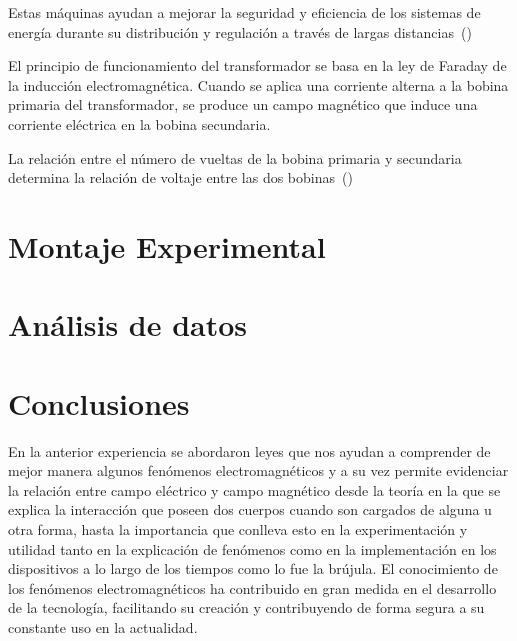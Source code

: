\documentclass[twocolumn, 12pt]{article}
\begin{document}
Estas máquinas ayudan a mejorar la seguridad y eficiencia
de los sistemas de energía durante su distribución y
regulación a través de largas
distancias~(\cite{tecsa_2021})

El principio de funcionamiento del transformador se basa en
la ley de Faraday de la inducción electromagnética. Cuando
se aplica una corriente alterna a la bobina primaria del
transformador, se produce un campo magnético que induce una
corriente eléctrica en la bobina secundaria.

La relación entre el número de vueltas de la bobina
primaria y secundaria determina la relación de voltaje
entre las dos bobinas~(\cite{rodriguez_2014})

\section{Montaje Experimental}

\section{Análisis de datos}

\section{Conclusiones}

En la anterior experiencia se abordaron leyes que nos
ayudan a comprender de mejor manera algunos fenómenos
electromagnéticos y a su vez permite evidenciar la relación
entre campo eléctrico y campo magnético desde la teoría en
la que se explica la interacción que poseen dos cuerpos
cuando son cargados de alguna u otra forma, hasta la
importancia que conlleva esto en la experimentación y
utilidad tanto en la explicación de fenómenos como en la
implementación en los dispositivos a lo largo de los
tiempos como lo fue la brújula. El conocimiento de los
fenómenos electromagnéticos ha contribuido en gran medida
en el desarrollo de la tecnología, facilitando su creación
y contribuyendo de forma segura a su constante uso en la
actualidad.

\printbibliography
\end{document}
